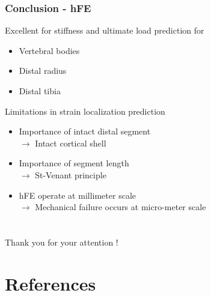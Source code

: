 \documentclass[xcolor=table,11pt]{beamer}
\begin{document}
	\begin{frame}
		\frametitle{Conclusion - hFE}
		Excellent for stiffness and ultimate load prediction for
		\begin{itemize}
			\item Vertebral bodies
			\item Distal radius
			\item Distal tibia
		\end{itemize}
		
		\vspace{5mm}

		Limitations in strain localization prediction
		\begin{itemize}
			\item Importance of intact distal segment\\$\rightarrow$ Intact cortical shell
			\item Importance of segment length\\$\rightarrow$ St-Venant principle
			\item hFE operate at millimeter scale\\$\rightarrow$ Mechanical failure occurs at micro-meter scale
		\end{itemize}

	\end{frame}
	
	
	\section{}
	\begin{frame}
		\centering
		\vfill
		Thank you for your attention !\\
		\vfill
	\end{frame}
	
	
	\appendix
	
	\section{References}
\end{document}
